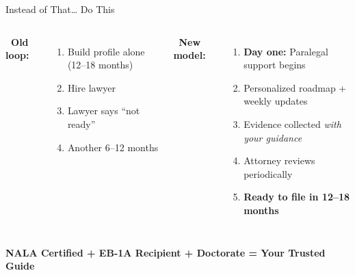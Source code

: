 \documentclass[aspectratio=169, 10pt]{beamer}
\begin{document}
	\begin{frame}{Instead of That… Do This}
		\begin{columns}[T]
			\textbf{\faThumbsDown \ Old loop:}
			\begin{enumerate}
				\item Build profile alone (12--18 months)
				\item Hire lawyer
				\item Lawyer says ``not ready''
				\item Another 6--12 months
			\end{enumerate}
			\textbf{\faCheckCircle \ New model:}
			\begin{enumerate}
				\item \textbf{Day one:} Paralegal support begins
				\item Personalized roadmap + weekly updates
				\item Evidence collected \textit{with your guidance}
				\item Attorney reviews periodically
				\item \textbf{Ready to file in 12--18 months}
			\end{enumerate}
		\end{columns}
		
		\vspace{0.5cm}
		\centering
		\textcolor{navyblue}{\Large \textbf{NALA Certified + EB-1A Recipient + Doctorate = Your Trusted Guide}}
	\end{frame}
	
\end{document}
